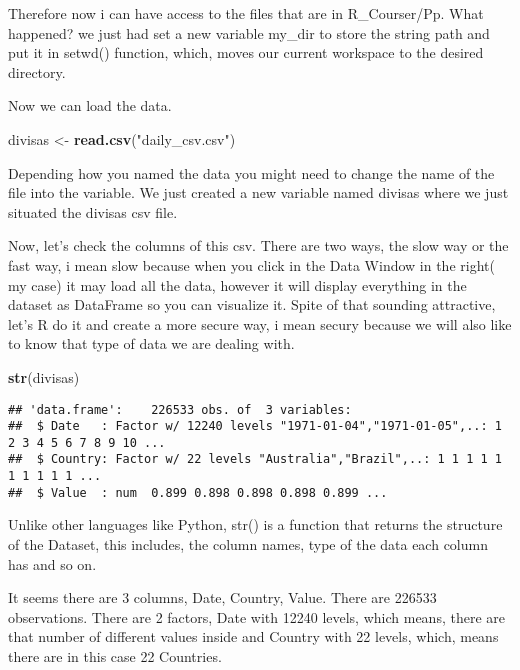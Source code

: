 \documentclass[]{article}
\newenvironment{Shaded}{\begin{snugshade}}{\end{snugshade}}
\newcommand{\KeywordTok}[1]{\textcolor[rgb]{0.13,0.29,0.53}{\textbf{#1}}}
\newcommand{\NormalTok}[1]{#1}
\newcommand{\StringTok}[1]{\textcolor[rgb]{0.31,0.60,0.02}{#1}}
\begin{document}
Therefore now i can have access to the files that are in R\_Courser/Pp.
What happened? we just had set a new variable my\_dir to store the
string path and put it in setwd() function, which, moves our current
workspace to the desired directory.

Now we can load the data.

\begin{Shaded}
\begin{Highlighting}[]
\NormalTok{divisas <-}\StringTok{ }\KeywordTok{read.csv}\NormalTok{(}\StringTok{"daily_csv.csv"}\NormalTok{)}
\end{Highlighting}
\end{Shaded}

Depending how you named the data you might need to change the name of
the file into the variable. We just created a new variable named divisas
where we just situated the divisas csv file.

Now, let's check the columns of this csv. There are two ways, the slow
way or the fast way, i mean slow because when you click in the Data
Window in the right( my case) it may load all the data, however it will
display everything in the dataset as DataFrame so you can visualize it.
Spite of that sounding attractive, let's R do it and create a more
secure way, i mean secury because we will also like to know that type of
data we are dealing with.

\begin{Shaded}
\begin{Highlighting}[]
\KeywordTok{str}\NormalTok{(divisas)}
\end{Highlighting}
\end{Shaded}

\begin{verbatim}
## 'data.frame':    226533 obs. of  3 variables:
##  $ Date   : Factor w/ 12240 levels "1971-01-04","1971-01-05",..: 1 2 3 4 5 6 7 8 9 10 ...
##  $ Country: Factor w/ 22 levels "Australia","Brazil",..: 1 1 1 1 1 1 1 1 1 1 ...
##  $ Value  : num  0.899 0.898 0.898 0.898 0.899 ...
\end{verbatim}

Unlike other languages like Python, str() is a function that returns the
structure of the Dataset, this includes, the column names, type of the
data each column has and so on.

It seems there are 3 columns, Date, Country, Value. There are 226533
observations. There are 2 factors, Date with 12240 levels, which means,
there are that number of different values inside and Country with 22
levels, which, means there are in this case 22 Countries.
\end{document}
